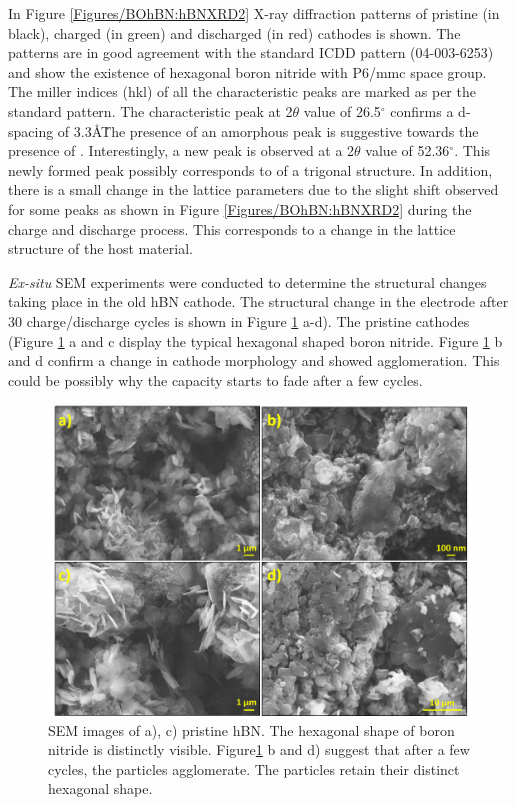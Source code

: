In Figure \ref{Figures/BOhBN:hBNXRD2} X-ray diffraction patterns of pristine (in black), charged (in green) and discharged (in red) cathodes is shown. The patterns are in good agreement with the standard ICDD pattern (04-003-6253) and show the existence of hexagonal boron nitride with P6/mmc space group. The miller indices (hkl) of all the characteristic peaks are marked as per the standard pattern. The characteristic peak at 2$\theta$ value of 26.5$^{\circ}$ confirms a d-spacing of 3.3\AA\. The presence of an amorphous peak is suggestive towards the presence of . Interestingly, a new peak is observed at a 2$\theta$ value of 52.36$^{\circ}$. This newly formed peak possibly corresponds to  of a trigonal structure. In addition, there is a small change in the lattice parameters due to the slight shift observed for some peaks as shown in Figure \ref{Figures/BOhBN:hBNXRD2} during the charge and discharge process. This corresponds to a change in the lattice structure of the host material. 

\textit{Ex-situ} SEM experiments were conducted to determine the structural changes taking place in the old hBN cathode. The structural change in the electrode after 30 charge/discharge cycles is shown in Figure \ref{Figures/BOhBN:hBNSEM} a-d). The pristine cathodes (Figure \ref{Figures/BOhBN:hBNSEM} a and c display the typical hexagonal shaped boron nitride. Figure \ref{Figures/BOhBN:hBNSEM} b and d confirm a change in cathode morphology and showed agglomeration. This could be possibly why the capacity starts to fade after a few cycles.

\begin{figure}[tbh!]
\centering
\includegraphics[width=\textwidth]{Figures/BOhBN/hBNSEM}
\caption{SEM images of a), c) pristine hBN. The hexagonal shape of boron nitride is distinctly visible. Figure\ref{Figures/BOhBN:hBNSEM} b and d) suggest that after a few cycles, the particles agglomerate. The particles retain their distinct hexagonal shape.}
\label{Figures/BOhBN:hBNSEM}
\end{figure}

